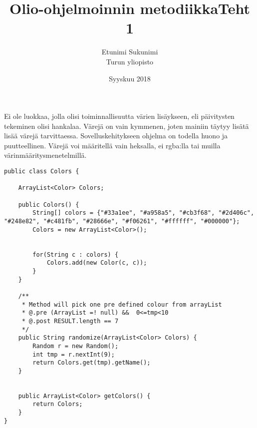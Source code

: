 \documentclass[a4paper,12pt,titlepage]{article}
\title{Olio-ohjelmoinnin metodiikka}
\author{Etunimi Sukunimi\\[1cm]
 Turun yliopisto}
\date{Syyskuu 2018}
\theoremstyle{definition}
\theoremstyle{remark}
\begin{document}
\maketitle          %
\tableofcontents    %


\section{}

Ei ole luokkaa, jolla olisi toiminnallisuutta värien lisäykseen, eli päivitysten tekeminen olisi hankalaa. Värejä on vain kymmenen, joten mainiin täytyy lisätä lisää värejä tarvittaessa. Sovelluskehitykseen ohjelma on todella huono ja puutteellinen. Värejä voi määritellä vain heksalla, ei rgba:lla tai muilla värinmääritysmenetelmillä. 


\renewcommand{\refname}{Kirjallisuutta} %

\newpage

\title{Teht 1}
\begin{lstlisting}
public class Colors {

    ArrayList<Color> Colors;

    public Colors() {
        String[] colors = {"#33a1ee", "#a958a5", "#cb3f68", "#2d406c", "#248e82", "#c481fb", "#28666e", "#f06261", "#ffffff", "#000000"};
        Colors = new ArrayList<Color>();


        for(String c : colors) {
            Colors.add(new Color(c, c));
        }
    }

    /**
     * Method will pick one pre defined colour from arrayList
     * @.pre (ArrayList =! null) &&  0<=tmp<10
     * @.post RESULT.length == 7
     */
    public String randomize(ArrayList<Color> Colors) {
        Random r = new Random();
        int tmp = r.nextInt(9);
        return Colors.get(tmp).getName();
    }


    public ArrayList<Color> getColors() {
        return Colors;
    }
}
\end{lstlisting}

\newpage
\end{document}
